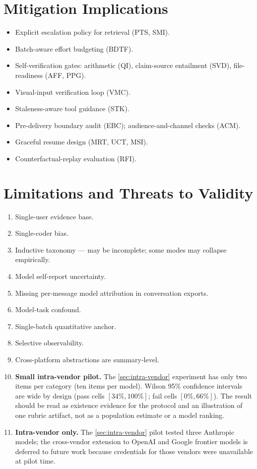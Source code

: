 \documentclass[11pt]{article}
\begin{document}
\section{Mitigation Implications}
\begin{itemize}[leftmargin=*]
  \item Explicit escalation policy for retrieval (PTS, SMI).
  \item Batch-aware effort budgeting (BDTF).
  \item Self-verification gates: arithmetic (QI), claim-source entailment (SVD), file-readiness (AFF, PPG).
  \item Visual-input verification loop (VMC).
  \item Staleness-aware tool guidance (STK).
  \item Pre-delivery boundary audit (EBC); audience-and-channel checks (ACM).
  \item Graceful resume design (MRT, UCT, MSI).
  \item Counterfactual-replay evaluation (RFI).
\end{itemize}

\section{Limitations and Threats to Validity}
\begin{enumerate}[leftmargin=*, label=\arabic*.]
  \item Single-user evidence base.
  \item Single-coder bias.
  \item Inductive taxonomy --- may be incomplete; some modes may collapse empirically.
  \item Model self-report uncertainty.
  \item Missing per-message model attribution in conversation exports.
  \item Model-task confound.
  \item Single-batch quantitative anchor.
  \item Selective observability.
  \item Cross-platform abstractions are summary-level.
  \item \textbf{Small intra-vendor pilot.} The \cref{sec:intra-vendor} experiment has only two items per category (ten items per model). Wilson 95\% confidence intervals are wide by design (pass cells \([34\%, 100\%]\); fail cells \([0\%, 66\%]\)). The result should be read as existence evidence for the protocol and an illustration of one rubric artifact, not as a population estimate or a model ranking.
  \item \textbf{Intra-vendor only.} The \cref{sec:intra-vendor} pilot tested three Anthropic models; the cross-vendor extension to OpenAI and Google frontier models is deferred to future work because credentials for those vendors were unavailable at pilot time.
\end{enumerate}
\end{document}
